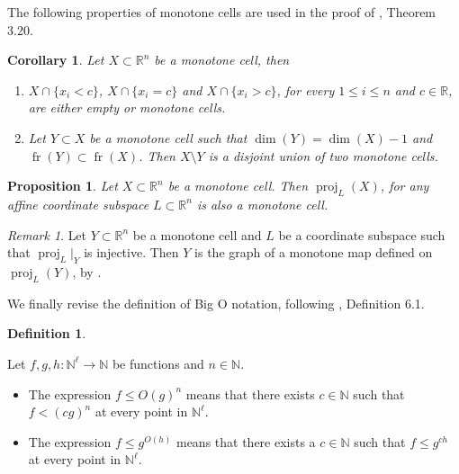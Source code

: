 \documentclass[
]{book}
\providecommand{\tightlist}{%
  \setlength{\itemsep}{0pt}\setlength{\parskip}{0pt}}
\newtheorem{corollary}{Corollary}[chapter]
\newtheorem{proposition}{Proposition}[chapter]
\theoremstyle{definition}
\newtheorem{definition}{Definition}[chapter]
\theoremstyle{definition}
\theoremstyle{definition}
\theoremstyle{definition}
\theoremstyle{remark}
\newtheorem*{remark}{Remark}
\begin{document}
The following properties of monotone cells are used in the proof of \citet{bgv15}, Theorem 3.20.

\begin{corollary}

\citep[Corollary 7, Theorem 11]{bgv13}
Let \(X \subset \mathbb{R}^n\) be a monotone cell, then

\begin{enumerate}
\def\labelenumi{\arabic{enumi}.}
\tightlist
\item
  \(X \cap \{ x_i < c \}\), \(X \cap \{ x_i = c \}\) and \(X \cap \{ x_i > c \}\), for every \(1 \le i \le n\) and \(c \in \mathbb{R}\), are either empty or monotone cells.
\item
  Let \(Y \subset X\) be a monotone cell such that \(\dim(Y) = \dim(X) - 1\) and \({\operatorname{fr} \left( Y \right)} \subset {\operatorname{fr} \left( X \right)}\). Then \(X \setminus Y\) is a disjoint union of two monotone cells.
\end{enumerate}

\end{corollary}

\begin{proposition}
\citep[Theorem 10]{bgv13}
Let \(X \subset \mathbb{R}^n\) be a monotone cell. Then \(\operatorname{proj}_{L}(X)\), for any affine coordinate subspace \(L \subset \mathbb{R}^n\) is also a monotone cell.
\end{proposition}

\begin{remark}
\citep[Remark 2.11]{bgv15}
Let \(Y \subset \mathbb{R}^n\) be a monotone cell and \(L\) be a coordinate subspace such that \(\operatorname{proj}_L\vert_Y\) is injective.
Then \(Y\) is the graph of a monotone map defined on \(\operatorname{proj}_L(Y)\), by \citep[Theorem 7 and Corollary 5]{bgv13}.
\end{remark}

We finally revise the definition of Big O notation, following \citet{gv2009}, Definition 6.1.

\begin{definition}
\protect\hypertarget{def:big-o}{}\label{def:big-o}

\citep[Definition 6.1]{gv2009}
Let \(f,g,h : \mathbb{N}^\ell \to \mathbb{N}\) be functions and \(n \in \mathbb{N}\).

\begin{itemize}
\tightlist
\item
  The expression \(f \le O(g)^n\) means that there exists \(c \in \mathbb{N}\) such that \(f < (cg)^n\) at every point in \(\mathbb{N}^\ell\).
\item
  The expression \(f \le g^{O(h)}\) means that there exists a \(c \in \mathbb{N}\) such that \(f \le g^{ch}\) at every point in \(\mathbb{N}^\ell\).
\end{itemize}

\end{definition}
\end{document}
